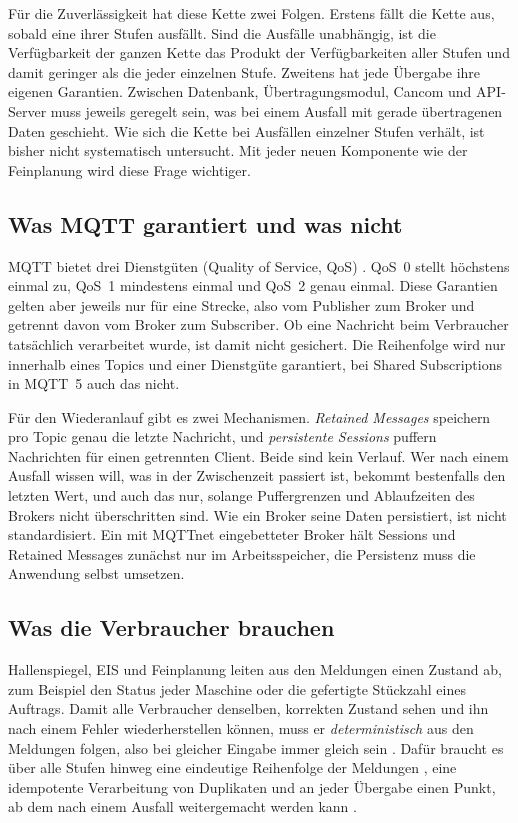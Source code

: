 \documentclass[11pt, a4paper]{article}
\begin{document}
Für die Zuverlässigkeit hat diese Kette zwei Folgen. Erstens fällt die Kette aus, sobald eine ihrer Stufen ausfällt. Sind die Ausfälle unabhängig, ist die Verfügbarkeit der ganzen Kette das Produkt der Verfügbarkeiten aller Stufen und damit geringer als die jeder einzelnen Stufe. Zweitens hat jede Übergabe ihre eigenen Garantien. Zwischen Datenbank, Übertragungsmodul, Cancom und API-Server muss jeweils geregelt sein, was bei einem Ausfall mit gerade übertragenen Daten geschieht. Wie sich die Kette bei Ausfällen einzelner Stufen verhält, ist bisher nicht systematisch untersucht. Mit jeder neuen Komponente wie der Feinplanung wird diese Frage wichtiger.

\subsection{Was MQTT garantiert und was nicht}

MQTT bietet drei Dienstgüten (Quality of Service, QoS) \cite{mqtt311,mqtt5}. QoS~0 stellt höchstens einmal zu, QoS~1 mindestens einmal und QoS~2 genau einmal. Diese Garantien gelten aber jeweils nur für eine Strecke, also vom Publisher zum Broker und getrennt davon vom Broker zum Subscriber. Ob eine Nachricht beim Verbraucher tatsächlich verarbeitet wurde, ist damit nicht gesichert. Die Reihenfolge wird nur innerhalb eines Topics und einer Dienstgüte garantiert, bei Shared Subscriptions in MQTT~5 auch das nicht.

Für den Wiederanlauf gibt es zwei Mechanismen. \emph{Retained Messages} speichern pro Topic genau die letzte Nachricht, und \emph{persistente Sessions} puffern Nachrichten für einen getrennten Client. Beide sind kein Verlauf. Wer nach einem Ausfall wissen will, was in der Zwischenzeit passiert ist, bekommt bestenfalls den letzten Wert, und auch das nur, solange Puffergrenzen und Ablaufzeiten des Brokers nicht überschritten sind. Wie ein Broker seine Daten persistiert, ist nicht standardisiert. Ein mit MQTTnet eingebetteter Broker hält Sessions und Retained Messages zunächst nur im Arbeitsspeicher, die Persistenz muss die Anwendung selbst umsetzen.

\subsection{Was die Verbraucher brauchen}

Hallenspiegel, EIS und Feinplanung leiten aus den Meldungen einen Zustand ab, zum Beispiel den Status jeder Maschine oder die gefertigte Stückzahl eines Auftrags. Damit alle Verbraucher denselben, korrekten Zustand sehen und ihn nach einem Fehler wiederherstellen können, muss er \emph{deterministisch} aus den Meldungen folgen, also bei gleicher Eingabe immer gleich sein \cite{schneider1990statemachine}. Dafür braucht es über alle Stufen hinweg eine eindeutige Reihenfolge der Meldungen \cite{lamport1978time}, eine idempotente Verarbeitung von Duplikaten und an jeder Übergabe einen Punkt, ab dem nach einem Ausfall weitergemacht werden kann \cite{elnozahy2002rollback,chandy1985snapshots}.
\end{document}
